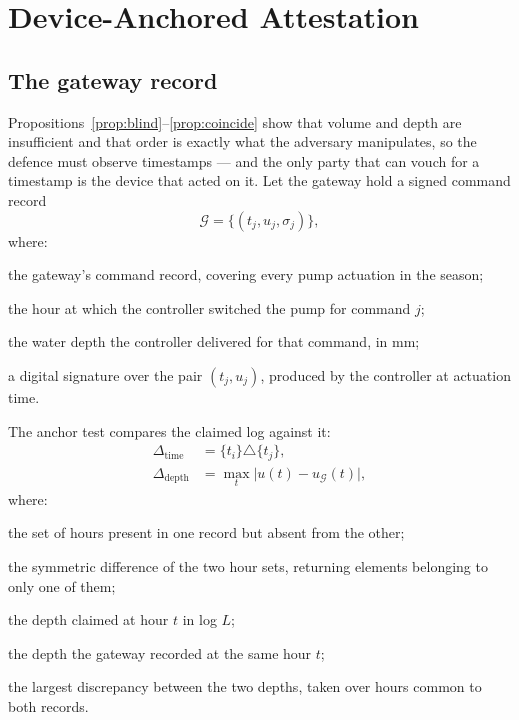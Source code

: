 \section{Device-Anchored Attestation}
\label{sec:anchor}

\subsection{The gateway record}

Propositions~\ref{prop:blind}--\ref{prop:coincide} show that volume and depth
are insufficient and that order is exactly what the adversary manipulates, so
the defence must observe timestamps --- and the only party that can vouch for
a timestamp is the device that acted on it. Let the gateway hold a signed
command record
\begin{equation}
\mathcal{G}=\{(t_j,u_j,\sigma_j)\},
\label{eq:gateway}
\end{equation}
where:
\begin{symbolist}
\item[$\mathcal{G}$] the gateway's command record, covering every pump actuation in the season;
\item[$t_j$] the hour at which the controller switched the pump for command $j$;
\item[$u_j$] the water depth the controller delivered for that command, in mm;
\item[$\sigma_j$] a digital signature over the pair $(t_j,u_j)$, produced by the controller at actuation time.
\end{symbolist} The anchor test compares the claimed log against it:
\begin{equation}
\begin{aligned}
\Delta_{\mathrm{time}}&=\{t_i\}\triangle\{t_j\},\\
\Delta_{\mathrm{depth}}&=\max_{t}\bigl|u(t)-u_{\mathcal{G}}(t)\bigr|,
\end{aligned}
\label{eq:deltas}
\end{equation}
where:
\begin{symbolist}
\item[$\Delta_{\mathrm{time}}$] the set of hours present in one record but absent from the other;
\item[$\triangle$] the symmetric difference of the two hour sets, returning elements belonging to only one of them;
\item[$u(t)$] the depth claimed at hour $t$ in log $L$;
\item[$u_{\mathcal{G}}(t)$] the depth the gateway recorded at the same hour $t$;
\item[$\Delta_{\mathrm{depth}}$] the largest discrepancy between the two depths, taken over hours common to both records.
\end{symbolist}

